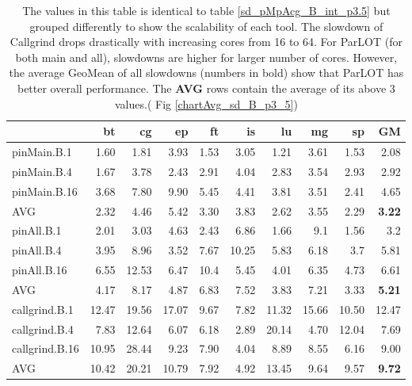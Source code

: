 \begin{table}[]
\caption{The values in this table is identical to table \ref{sd_pMpAcg_B_int_p3.5} but grouped differently to show the scalability of each tool. The slowdown of Callgrind drops drastically with increasing cores from 16 to 64. For ParLOT (for both main and all), slowdowns are higher for larger number of cores. However, the average GeoMean of all slowdowns (numbers in bold) show that ParLOT has better overall performance. The \textbf{AVG} rows contain the average of its above 3 values.( Fig \ref{chartAvg_sd_B_p3_5})}
\label{sd_pMpAcg_B_itn_p3.5}
\begin{center}
\begin{tabular}{|l|rrrrrrrr|r|}
\hline
                &    bt &    cg &    ep &   ft &    is &    lu &    mg &    sp &    GM \\
\hline
 pinMain.B.1    &  1.60 &  1.81 &  3.93 & 1.53 &  3.05 &  1.21 &  3.61 &  1.53 &  2.08 \\
 pinMain.B.4    &  1.67 &  3.78 &  2.43 & 2.91 &  4.04 &  2.83 &  3.54 &  2.93 &  2.92 \\
 pinMain.B.16   &  3.68 &  7.80 &  9.90 & 5.45 &  4.41 &  3.81 &  3.51 &  2.41 &  4.65 \\
 \hline
 AVG            &  2.32 &  4.46 &  5.42 & 3.30 &  3.83 &  2.62 &  3.55 &  2.29 &  \textbf{3.22} \\
 \hline
 pinAll.B.1     &  2.01 &  3.03 &  4.63 & 2.43 &  6.86 &  1.66 &   9.1 &  1.56 &   3.2 \\
 pinAll.B.4     &  3.95 &  8.96 &  3.52 & 7.67 & 10.25 &  5.83 &  6.18 &   3.7 &  5.81 \\
 pinAll.B.16    &  6.55 & 12.53 &  6.47 & 10.4 &  5.45 &  4.01 &  6.35 &  4.73 &  6.61 \\
 \hline
 AVG            &  4.17 &  8.17 &  4.87 & 6.83 &  7.52 &  3.83 &  7.21 &  3.33 &  \textbf{5.21} \\
 \hline
 callgrind.B.1  & 12.47 & 19.56 & 17.07 & 9.67 &  7.82 & 11.32 & 15.66 & 10.50 & 12.47 \\
 callgrind.B.4  &  7.83 & 12.64 &  6.07 & 6.18 &  2.89 & 20.14 &  4.70 & 12.04 &  7.69 \\
 callgrind.B.16 & 10.95 & 28.44 &  9.23 & 7.90 &  4.04 &  8.89 &  8.55 &  6.16 &  9.00 \\
 \hline
 AVG            & 10.42 & 20.21 & 10.79 & 7.92 &  4.92 & 13.45 &  9.64 &  9.57 &  \textbf{9.72}\\
 \hline
\end{tabular}
\end{center}
\end{table}









